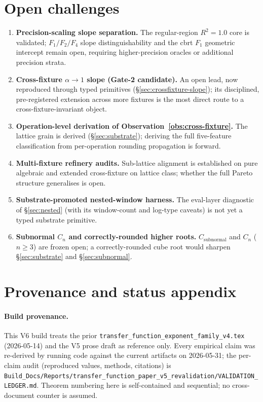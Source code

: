 \documentclass[11pt,a4paper]{article}
\begin{document}
\section{Open challenges}\label{sec:open}

\begin{enumerate}
    \item \textbf{Precision-scaling slope separation.} The regular-region $R^2=1.0$ core is validated; $F_1/F_2/F_4$ slope distinguishability and the cbrt $F_1$ geometric intercept remain open, requiring higher-precision oracles or additional precision strata.
    \item \textbf{Cross-fixture $\alpha\to1$ slope (Gate-2 candidate).} An open lead, now reproduced through typed primitives (\S\ref{sec:crossfixture-slope}); its disciplined, pre-registered extension across more fixtures is the most direct route to a cross-fixture-invariant object.
    \item \textbf{Operation-level derivation of Observation~\ref{obs:cross-fixture}.} The lattice grain is derived (\S\ref{sec:substrate}); deriving the full five-feature classification from per-operation rounding propagation is forward.
    \item \textbf{Multi-fixture refinery audits.} Sub-lattice alignment is established on pure algebraic and extended cross-fixture on lattice class; whether the full Pareto structure generalises is open.
    \item \textbf{Substrate-promoted nested-window harness.} The eval-layer diagnostic of \S\ref{sec:nested} (with its window-count and log-type caveats) is not yet a typed substrate primitive.
    \item \textbf{Subnormal $C_n$ and correctly-rounded higher roots.} $C_{\text{subnormal}}$ and $C_n$ ($n\ge3$) are frozen open; a correctly-rounded cube root would sharpen \S\ref{sec:substrate} and \S\ref{sec:subnormal}.
\end{enumerate}

\section{Provenance and status appendix}\label{sec:provenance}

\paragraph{Build provenance.} This V6 build treats the prior \texttt{transfer\_function\_exponent\_family\_v4.tex} (2026-05-14) and the V5 prose draft as reference only. Every empirical claim was re-derived by running code against the current artifacts on 2026-05-31; the per-claim audit (reproduced values, methods, citations) is \texttt{Build\_Docs/Reports/transfer\_function\_paper\_v5\_revalidation/VALIDATION\_LEDGER.md}. Theorem numbering here is self-contained and sequential; no cross-document counter is assumed.
\end{document}
